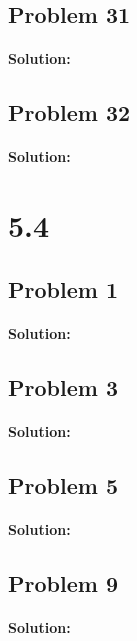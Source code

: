 \documentclass[11pt, notitlepage]{report}
\newenvironment{solution}{\paragraph{Solution:}}{\hfill}
\begin{document}
\subsection{Problem 31}
\begin{solution}
\end{solution}
\subsection{Problem 32}
\begin{solution}
\end{solution}
\section{5.4}
\subsection{Problem 1}
\begin{solution}
\end{solution}
\subsection{Problem 3}
\begin{solution}
\end{solution}
\subsection{Problem 5}
\begin{solution}
\end{solution}
\subsection{Problem 9}
\begin{solution}
\end{solution}
\end{document}
